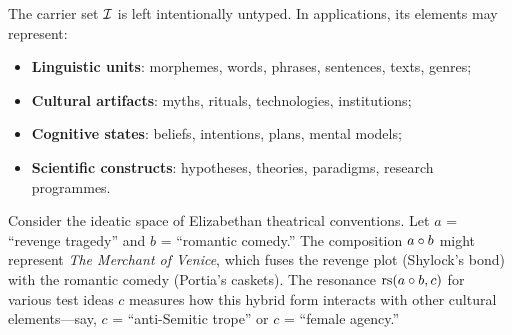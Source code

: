 The carrier set $\mathcal{I}$ is left intentionally untyped. In applications, its
elements may represent:
\begin{itemize}
    \item \textbf{Linguistic units}: morphemes, words, phrases, sentences,
          texts, genres;
    \item \textbf{Cultural artifacts}: myths, rituals, technologies,
          institutions;
    \item \textbf{Cognitive states}: beliefs, intentions, plans, mental
          models;
    \item \textbf{Scientific constructs}: hypotheses, theories, paradigms,
          research programmes.
\end{itemize}

\begin{example}
Consider the ideatic space of Elizabethan theatrical conventions. Let
$a$ = ``revenge tragedy'' and $b$ = ``romantic comedy.'' The composition
$a \circ b$ might represent \emph{The Merchant of Venice}, which fuses
the revenge plot (Shylock's bond) with the romantic comedy (Portia's
caskets). The resonance $\mathrm{rs}(a \circ b, c)$ for various test ideas $c$
measures how this hybrid form interacts with other cultural elements---say,
$c$ = ``anti-Semitic trope'' or $c$ = ``female agency.''
\end{example}

